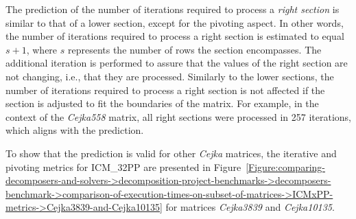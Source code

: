 The prediction of the number of iterations required to process a \textit{right section} is similar to that of a lower section, except for the pivoting aspect.
In other words, the number of iterations required to process a right section is estimated to equal $s + 1$, where $s$ represents the number of rows the section encompasses.
The additional iteration is performed to assure that the values of the right section are not changing, i.e., that they are processed.
Similarly to the lower sections, the number of iterations required to process a right section is not affected if the section is adjusted to fit the boundaries of the matrix.
For example, in the context of the \textit{Cejka558} matrix, all right sections were processed in 257 iterations, which aligns with the prediction.

To show that the prediction is valid for other \textit{Cejka} matrices, the iterative and pivoting metrics for ICM\_32PP are presented in Figure~\ref{Figure:comparing-decomposers-and-solvers->decomposition-project-benchmarks->decomposers-benchmark->comparison-of-execution-times-on-subset-of-matrices->ICMxPP-metrics->Cejka3839-and-Cejka10135} for matrices \textit{Cejka3839} and \textit{Cejka10135}.

